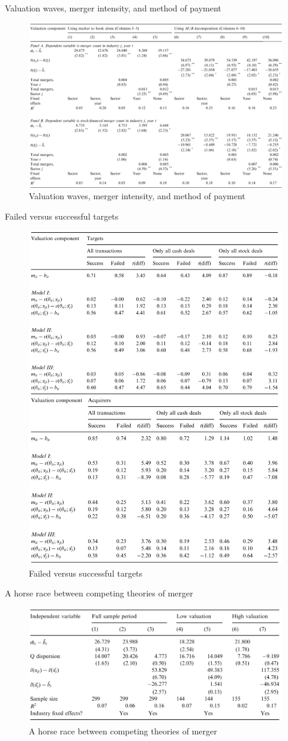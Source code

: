 \documentclass[aspectratio=169,xcolor=dvipsnames]{beamer}
\begin{document}
\begin{frame}{Valuation waves, merger intensity, and method of payment}
    \begin{figure}
        \includegraphics[width=0.8\linewidth]{figures/p2_table10.png}
        \caption{Valuation waves, merger intensity, and method of payment}
    \end{figure}
\end{frame}

\begin{frame}{Failed versus successful targets}
    \begin{figure}
        \includegraphics[width=0.4\linewidth]{figures/p2_table11.png}
        \caption{Failed versus successful targets}
    \end{figure}
\end{frame}

\begin{frame}{A horse race between competing theories of merger}
    \begin{figure}
        \includegraphics[width=1\linewidth]{figures/p2_table12.png}
        \caption{A horse race between competing theories of merger}
    \end{figure}
\end{frame}
\end{document}
